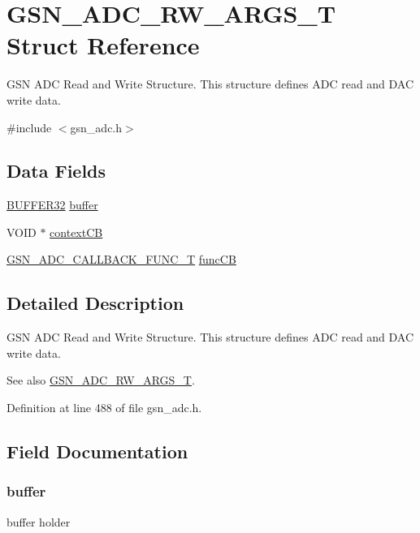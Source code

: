 \hypertarget{a00025}{
\section{GSN\_\-ADC\_\-RW\_\-ARGS\_\-T Struct Reference}
\label{a00025}
}


GSN ADC Read and Write Structure. This structure defines ADC read and DAC write data.  




{\ttfamily \#include $<$gsn\_\-adc.h$>$}

\subsection*{Data Fields}
\begin{DoxyCompactItemize}
\item 
\hyperlink{a00004}{BUFFER32} \hyperlink{a00025_a789378f386053b37ba03aeb73f3efc84}{buffer}
\item 
VOID $\ast$ \hyperlink{a00025_a2898b010839acbc30fb49ec89189292c}{contextCB}
\item 
\hyperlink{a00643_ga988a548c116a5b35c3725a268f74519a}{GSN\_\-ADC\_\-CALLBACK\_\-FUNC\_\-T} \hyperlink{a00025_a3118889ff58e61fd288f912be3d653e9}{funcCB}
\end{DoxyCompactItemize}


\subsection{Detailed Description}
GSN ADC Read and Write Structure. This structure defines ADC read and DAC write data. 

\begin{DoxySeeAlso}{See also}
\hyperlink{a00025}{GSN\_\-ADC\_\-RW\_\-ARGS\_\-T}. 
\end{DoxySeeAlso}


Definition at line 488 of file gsn\_\-adc.h.



\subsection{Field Documentation}
\hypertarget{a00025_a789378f386053b37ba03aeb73f3efc84}{
\subsubsection[{buffer}]{ {\bf buffer}}}
\label{a00025_a789378f386053b37ba03aeb73f3efc84}
buffer holder 

